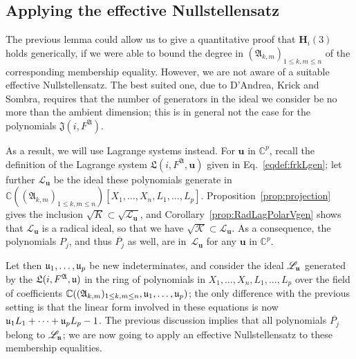 \documentclass[12pt]{article}
\def\frkJ{\mathfrak{J}}
\def\frkL{\mathfrak{L}}
\def\A{\mathfrak{A}}
\def\C{\mathbb{C}}
\begin{document}

\subsection{Applying the effective Nullstellensatz}

The previous lemma could allow us to give a quantitative proof that
$\bm H_i(3)$ holds generically, if we were able to bound the degree in
$(\A_{k,m})_{1 \le k,m \le n}$ of the corresponding membership
equality. However, we are not aware of a suitable effective
Nullstellensatz. The best suited one, due to D'Andrea, Krick and
Sombra, requires that the number of generators in the ideal we
consider be no more than the ambient dimension; this is in general not
the case for the polynomials ${\frkJ}(i, F^\A)$.

As a result, we will use Lagrange systems instead. For $\bm u$ in
$\C^p$, recall the definition of the Lagrange system ${\frkL}(i, F^\A,
\bm u)$ given in Eq.~\eqref{eqdef:frkLgen}; let further
$\mathscr{L}_{\bm u}$ be the ideal these polynomials generate in
$\C((\A_{k,m})_{1 \le k,m \le n})[X_1,\dots,X_n,L_1,\dots,L_p]$.
Proposition~\ref{prop:projection} gives the inclusion $\sqrt{K}
\subset \sqrt{\mathscr{L}_{\bm u}}$, and
Corollary~\ref{prop:RadLagPolarVgen} shows that $\mathscr{L}_{\bm u}$ is
a radical ideal, so that we have $\sqrt{\mathscr{K}} \subset
\mathscr{L}_{\bm u}$. As a consequence, the polynomials $P_j$, and
thus $\overline{P_j}$ as well, are in~$\mathscr{L}_{\bm u}$ for
any $\bm u$ in $\C^p$.

Let then $\frak u_1,\dots,\frak u_p$ be new indeterminates, and
consider the ideal $\mathscr{L}_{\bm{\frak u}}$ generated by the
${\frkL}(i, F^\A, \frak u)$ in the ring of polynomials in
$X_1,\dots,X_n,L_1,\dots,L_p$ over the field of coefficients
$\C((\A_{k,m})_{1 \le k,m \le n},\frak u_1,\dots,\frak u_p)$; the only
difference with the previous setting is that the linear form involved
in these equations is now $\frak u_1 L_1 + \cdots + \frak u_p
L_p-1$. The previous discussion implies that all polynomials
$\overline{P_j}$ belong to $\mathscr{L}_{\bm{\frak u}}$; we are now
going to apply an effective Nullstellensatz to these membership
equalities.
\end{document}
